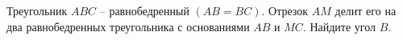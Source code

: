 \begin{ex}
	\begin{condition}
		Треугольник \( ABC \) – равнобедренный \( (AB = BC)\). Отрезок \( AM  \) делит его на два равнобедренных треугольника с	основаниями \( AB  \) и \( MC \). Найдите угол \( B \).
	\end{condition}
	\answer{\( 36\degree \)}
\end{ex}